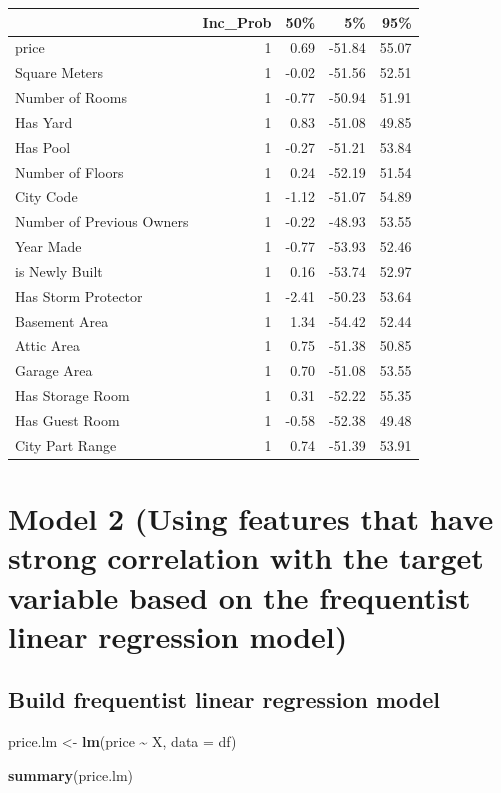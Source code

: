 \documentclass[
]{article}
\newenvironment{Shaded}{\begin{snugshade}}{\end{snugshade}}
\newcommand{\AttributeTok}[1]{\textcolor[rgb]{0.13,0.29,0.53}{#1}}
\newcommand{\FunctionTok}[1]{\textcolor[rgb]{0.13,0.29,0.53}{\textbf{#1}}}
\newcommand{\NormalTok}[1]{#1}
\newcommand{\OtherTok}[1]{\textcolor[rgb]{0.56,0.35,0.01}{#1}}
\newcommand{\SpecialCharTok}[1]{\textcolor[rgb]{0.81,0.36,0.00}{\textbf{#1}}}
\begin{document}
\begin{longtable}[]{@{}lrrrr@{}}
\toprule\noalign{}
& Inc\_Prob & 50\% & 5\% & 95\% \\
\midrule\noalign{}
\endhead
\bottomrule\noalign{}
\endlastfoot
price & 1 & 0.69 & -51.84 & 55.07 \\
Square Meters & 1 & -0.02 & -51.56 & 52.51 \\
Number of Rooms & 1 & -0.77 & -50.94 & 51.91 \\
Has Yard & 1 & 0.83 & -51.08 & 49.85 \\
Has Pool & 1 & -0.27 & -51.21 & 53.84 \\
Number of Floors & 1 & 0.24 & -52.19 & 51.54 \\
City Code & 1 & -1.12 & -51.07 & 54.89 \\
Number of Previous Owners & 1 & -0.22 & -48.93 & 53.55 \\
Year Made & 1 & -0.77 & -53.93 & 52.46 \\
is Newly Built & 1 & 0.16 & -53.74 & 52.97 \\
Has Storm Protector & 1 & -2.41 & -50.23 & 53.64 \\
Basement Area & 1 & 1.34 & -54.42 & 52.44 \\
Attic Area & 1 & 0.75 & -51.38 & 50.85 \\
Garage Area & 1 & 0.70 & -51.08 & 53.55 \\
Has Storage Room & 1 & 0.31 & -52.22 & 55.35 \\
Has Guest Room & 1 & -0.58 & -52.38 & 49.48 \\
City Part Range & 1 & 0.74 & -51.39 & 53.91 \\
\end{longtable}

\section{Model 2 (Using features that have strong correlation with the
target variable based on the frequentist linear regression
model)}\label{model-2-using-features-that-have-strong-correlation-with-the-target-variable-based-on-the-frequentist-linear-regression-model}

\subsection{Build frequentist linear regression
model}\label{build-frequentist-linear-regression-model}

\begin{Shaded}
\begin{Highlighting}[]
\NormalTok{price.lm }\OtherTok{\textless{}{-}} \FunctionTok{lm}\NormalTok{(price }\SpecialCharTok{\textasciitilde{}}\NormalTok{ X, }\AttributeTok{data =}\NormalTok{ df)}

\FunctionTok{summary}\NormalTok{(price.lm)}
\end{Highlighting}
\end{Shaded}
\end{document}
